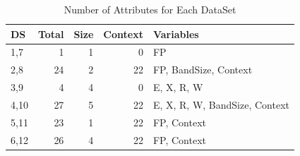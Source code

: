 \documentclass[conference]{IEEEtran}
\begin{document}
\begin{table}
\centering
\caption{Number of Attributes for Each DataSet}
\label{DSAttr}
\begin{tabular}{|l|r|r|r|l|}\hline
\textbf{DS} &  \textbf{Total} & \textbf{Size} & \textbf{Context} & \textbf{Variables}\\\hline
1,7 &  1     & 1    & 0  &  FP   \\
2,8 & 24     & 2    & 22 &  FP, BandSize, Context  \\
3,9 &  4     & 4    & 0  &  E, X, R, W   \\
4,10 & 27     & 5    & 22 &  E, X, R, W, BandSize, Context \\
5,11 & 23     & 1    & 22 &  FP, Context  \\
6,12 & 26     & 4    & 22 &  FP, Context  \\\hline
\end{tabular}
\end{table}
\end{document}
